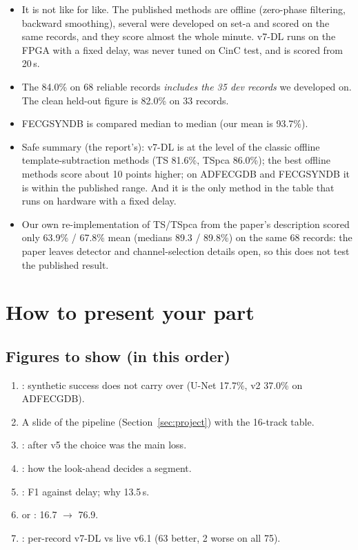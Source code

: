 \documentclass[11pt]{article}
\begin{document}
\begin{warn}
\begin{itemize}
  \item It is not like for like. The published methods are offline (zero-phase filtering, backward smoothing), several were developed on set-a and scored on the same records, and they score almost the whole minute. v7-DL runs on the FPGA with a fixed delay, was never tuned on CinC test, and is scored from 20\,s.
  \item The 84.0\% on 68 reliable records \emph{includes the 35 dev records} we developed on. The clean held-out figure is 82.0\% on 33 records.
  \item FECGSYNDB is compared median to median (our mean is 93.7\%).
  \item Safe summary (the report's): v7-DL is at the level of the classic offline template-subtraction methods (TS 81.6\%, TSpca 86.0\%); the best offline methods score about 10 points higher; on ADFECGDB and FECGSYNDB it is within the published range. And it is the only method in the table that runs on hardware with a fixed delay.
  \item Our own re-implementation of TS/TSpca from the paper's description scored only 63.9\% / 67.8\% mean (medians 89.3 / 89.8\%) on the same 68 records: the paper leaves detector and channel-selection details open, so this does not test the published result.
\end{itemize}
\end{warn}

\newpage
\section{How to present your part}
\label{sec:present}

\subsection{Figures to show (in this order)}
\begin{enumerate}
  \item {}: synthetic success does not carry over (U-Net 17.7\%, v2 37.0\% on ADFECGDB).
  \item A slide of the pipeline (Section~\ref{sec:project}) with the 16-track table.
  \item {}: after v5 the choice was the main loss.
  \item {}: how the look-ahead decides a segment.
  \item {}: F1 against delay; why 13.5\,s.
  \item {} or : 16.7 $\to$ 76.9.
  \item {}: per-record v7-DL vs live v6.1 (63 better, 2 worse on all 75).
\end{enumerate}
\end{document}
